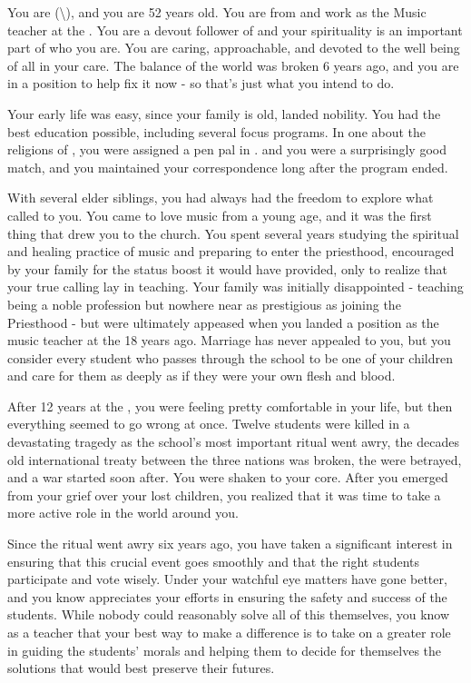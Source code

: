 \documentclass[char]{GL2020}
\begin{document}
\name{\cMusic{}}


You are \cMusic{} (\cMusic{\they}\textbackslash\cMusic{\them}), and you are 52 years old. You are from \pFarm{} and work as the Music teacher at the \pSchool{}. You are a devout follower of \cFarmGod{} and your spirituality is an important part of who you are. You are caring, approachable, and devoted to the well being of all in your care. The balance of the world was broken 6 years ago, and you are in a position to help fix it now - so that's just what you intend to do.

Your early life was easy, since your family is old, landed nobility. You had the best education possible, including several focus programs. In one about the religions of \pEarth{}, you were assigned a pen pal in \pTech{}. \cBeetle{} and you were a surprisingly good match, and you maintained your correspondence long after the program ended. 

With several elder siblings, you had always had the freedom to explore what called to you.  You came to love music from a young age, and it was the first thing that drew you to the church. You spent several years studying the spiritual and healing practice of music and preparing to enter the priesthood, encouraged by your family for the status boost it would have provided, only to realize that your true calling lay in teaching.  Your family was initially disappointed - teaching being a noble profession but nowhere near as prestigious as joining the Priesthood - but were ultimately appeased when you landed a position as the music teacher at the \pSchool{} 18 years ago. Marriage has never appealed to you, but you consider every student who passes through the school to be one of your children and care for them as deeply as if they were your own flesh and blood.

After 12 years at the \pSchool{}, you were feeling pretty comfortable in your life, but then everything seemed to go wrong at once. Twelve students were killed in a devastating tragedy as the school’s most important ritual went awry, the decades old international treaty between the three nations was broken, the \pShip{} were betrayed, and a war started soon after. You were shaken to your core.  After you emerged from your grief over your lost children, you realized that it was time to take a more active role in the world around you.

Since the ritual went awry six years ago, you have taken a significant interest in ensuring that this crucial event goes smoothly and that the right students participate and vote wisely.  Under your watchful eye matters have gone better, and you know \cPrincipal{} appreciates your efforts in ensuring the safety and success of the students. While nobody could reasonably solve all of this themselves, you know as a teacher that your best way to make a difference is to take on a greater role in guiding the students' morals and helping them to decide for themselves the solutions that would best preserve their futures.
\end{document}

